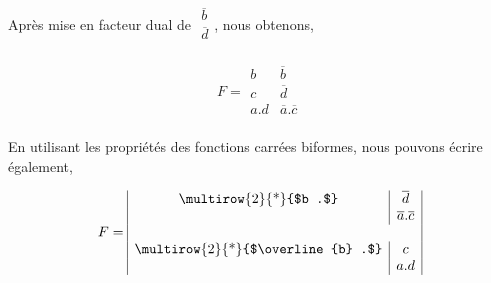 \medskip 


Après mise en facteur dual de $ \begin{array}{|c|} \overline{b} \\ \overline{d} \\\end{array}$, nous obtenons, 

\medskip

\[ F = 
\begin{array}{|c|c|}  b & \overline{b} \\ c & \overline{d} \\ a.d & \overline{a} . \overline{c} \\      \end{array}
\]

\medskip 

En utilisant les propriétés des fonctions carrées biformes, nous pouvons écrire également, 

\medskip

\[ F = 
\begin{array}{|c|c|}  $\multirow{2}{*}{$b .$}$ & \overline{d} \\ & \overline{a} . \overline{c} \\ 
                      \multicolumn{2}{|c|}{}  \\
                      $\multirow{2}{*}{$\overline{b} .$}$ & c  \\ & a . d \\ 
                           \end{array}
\]

\medskip 

